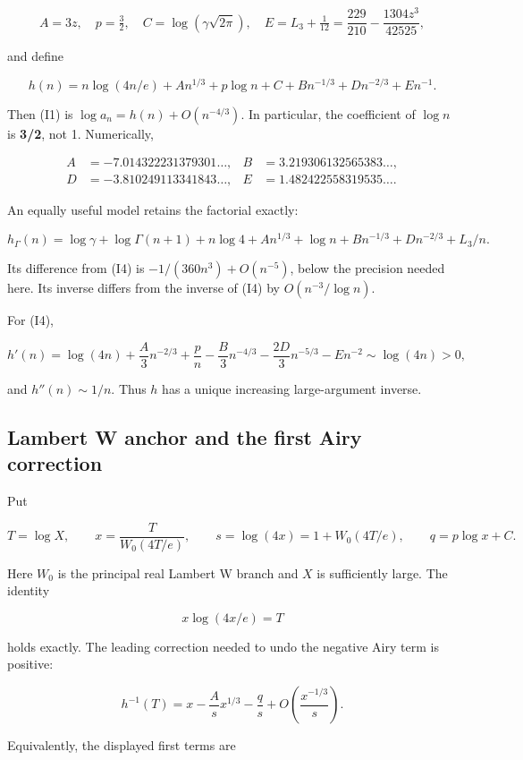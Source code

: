 \documentclass[11pt,letterpaper]{article}
\numberwithin{equation}{section}
\theoremstyle{remark}
\begin{document}
\[
A=3z,\quad p=\tfrac32,\quad C=\log(\gamma\sqrt{2\pi}),\quad
E=L_3+\tfrac1{12}=\frac{229}{210}-\frac{1304z^3}{42525},
\tag{I3}
\]

and define

\[
h(n)=n\log(4n/e)+A n^{1/3}+p\log n+C
+B n^{-1/3}+D n^{-2/3}+E n^{-1}.
\tag{I4}
\]

Then (I1) is \(\log a_n=h(n)+O(n^{-4/3})\). In particular, the coefficient of \(\log n\) is \textbf{3/2}, not 1. Numerically,

\[
\begin{aligned}
A&=-7.014322231379301\ldots,& B&=3.219306132565383\ldots,\\
D&=-3.810249113341843\ldots,& E&=1.482422558319535\ldots.
\end{aligned}
\]

An equally useful model retains the factorial exactly:

\[
h_\Gamma(n)=\log\gamma+\log\Gamma(n+1)+n\log4+A n^{1/3}+\log n
+B n^{-1/3}+D n^{-2/3}+L_3/n.
\tag{I5}
\]

Its difference from (I4) is \(-1/(360n^3)+O(n^{-5})\), below the precision needed here. Its inverse differs from the inverse of (I4) by \(O(n^{-3}/\log n)\).

For (I4),

\[
h'(n)=\log(4n)+\frac A3n^{-2/3}+\frac pn
-\frac B3n^{-4/3}-\frac{2D}3n^{-5/3}-E n^{-2}
\sim\log(4n)>0,
\tag{I6}
\]

and \(h''(n)\sim 1/n\). Thus \(h\) has a unique increasing large-argument inverse.

\subsection{Lambert W anchor and the first Airy correction}\label{air:rb:lambert-w-anchor-and-the-first-airy-correction}

Put

\[
T=\log X,\qquad x=\frac{T}{W_0(4T/e)},\qquad
s=\log(4x)=1+W_0(4T/e),\qquad q=p\log x+C.
\tag{I7}
\]

Here \(W_0\) is the principal real Lambert W branch and \(X\) is sufficiently large. The identity

\[
x\log(4x/e)=T
\]

holds exactly. The leading correction needed to undo the negative Airy term is positive:

\[
h^{-1}(T)=x-\frac{A}{s}x^{1/3}-\frac{q}{s}
+O\!\left(\frac{x^{-1/3}}s\right).
\tag{I8}
\]

Equivalently, the displayed first terms are
\end{document}

